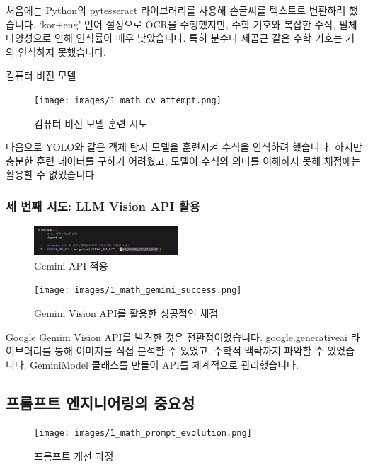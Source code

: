 처음에는 Python의 pytesseract 라이브러리를 사용해 손글씨를 텍스트로 변환하려 했습니다. `kor+eng' 언어 설정으로 OCR을 수행했지만, 수학 기호와 복잡한 수식, 필체 다양성으로 인해 인식률이 매우 낮았습니다. 특히 분수나 제곱근 같은 수학 기호는 거의 인식하지 못했습니다.

{컴퓨터 비전 모델}

\begin{figure}[H]
    \centering
    \texttt{[image: images/1\_math\_cv\_attempt.png]}
    \caption{컴퓨터 비전 모델 훈련 시도}
    \label{fig:math_cv_attempt}
\end{figure}

다음으로 YOLO와 같은 객체 탐지 모델을 훈련시켜 수식을 인식하려 했습니다. 하지만 충분한 훈련 데이터를 구하기 어려웠고, 모델이 수식의 의미를 이해하지 못해 채점에는 활용할 수 없었습니다.

\subsubsection{세 번째 시도: LLM Vision API 활용}

\begin{figure}[H]
    \centering
    \includegraphics[width=0.48\textwidth]{1/image01.png}
    \caption{Gemini API 적용}
    \label{fig:math_gemini_application}
\end{figure}
\begin{figure}[H]
    \centering
    \texttt{[image: images/1\_math\_gemini\_success.png]}
    \caption{Gemini Vision API를 활용한 성공적인 채점}
    \label{fig:math_gemini_success}
\end{figure}

Google Gemini Vision API를 발견한 것은 전환점이었습니다. google.generativeai 라이브러리를 통해 이미지를 직접 분석할 수 있었고, 수학적 맥락까지 파악할 수 있었습니다. GeminiModel 클래스를 만들어 API를 체계적으로 관리했습니다.

\subsection{프롬프트 엔지니어링의 중요성}

\begin{figure}[H]
    \centering
    \texttt{[image: images/1\_math\_prompt\_evolution.png]}
    \caption{프롬프트 개선 과정}
    \label{fig:math_prompt_evolution}
\end{figure}


